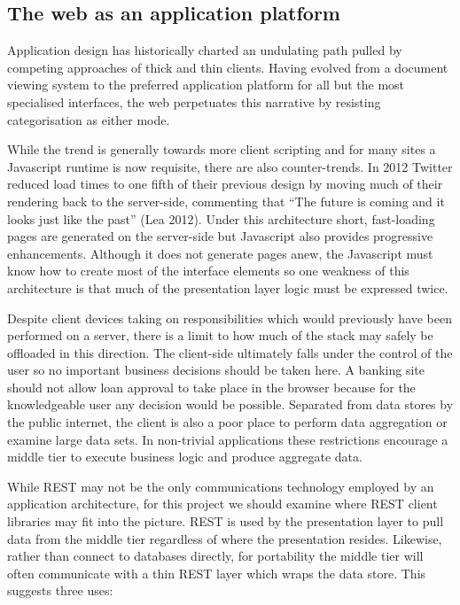 \documentclass[12pt, ]{article}
\begin{document}
\subsection{The web as an application
platform}\label{the-web-as-an-application-platform}

Application design has historically charted an undulating path pulled by
competing approaches of thick and thin clients. Having evolved from a
document viewing system to the preferred application platform for all
but the most specialised interfaces, the web perpetuates this narrative
by resisting categorisation as either mode.

While the trend is generally towards more client scripting and for many
sites a Javascript runtime is now requisite, there are also
counter-trends. In 2012 Twitter reduced load times to one fifth of their
previous design by moving much of their rendering back to the
server-side, commenting that ``The future is coming and it looks just
like the past'' (Lea 2012). Under this architecture short, fast-loading
pages are generated on the server-side but Javascript also provides
progressive enhancements. Although it does not generate pages anew, the
Javascript must know how to create most of the interface elements so one
weakness of this architecture is that much of the presentation layer
logic must be expressed twice.

Despite client devices taking on responsibilities which would previously
have been performed on a server, there is a limit to how much of the
stack may safely be offloaded in this direction. The client-side
ultimately falls under the control of the user so no important business
decisions should be taken here. A banking site should not allow loan
approval to take place in the browser because for the knowledgeable user
any decision would be possible. Separated from data stores by the public
internet, the client is also a poor place to perform data aggregation or
examine large data sets. In non-trivial applications these restrictions
encourage a middle tier to execute business logic and produce aggregate
data.

While REST may not be the only communications technology employed by an
application architecture, for this project we should examine where REST
client libraries may fit into the picture. REST is used by the
presentation layer to pull data from the middle tier regardless of where
the presentation resides. Likewise, rather than connect to databases
directly, for portability the middle tier will often communicate with a
thin REST layer which wraps the data store. This suggests three uses:
\end{document}
